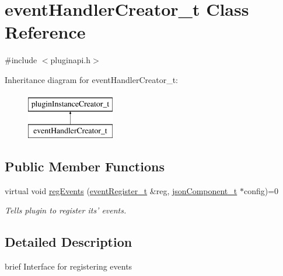 \hypertarget{classeventHandlerCreator__t}{\section{event\-Handler\-Creator\-\_\-t \-Class \-Reference}
\label{classeventHandlerCreator__t}
}


{\ttfamily \#include $<$pluginapi.\-h$>$}

\-Inheritance diagram for event\-Handler\-Creator\-\_\-t\-:\begin{figure}[H]
\begin{center}
\leavevmode
\includegraphics[height=2.000000cm]{classeventHandlerCreator__t}
\end{center}
\end{figure}
\subsection*{\-Public \-Member \-Functions}
\begin{DoxyCompactItemize}
\item 
virtual void \hyperlink{classeventHandlerCreator__t_a89472cf383359bbfd86595050a277263}{reg\-Events} (\hyperlink{classeventRegister__t}{event\-Register\-\_\-t} \&reg, \hyperlink{classjsonComponent__t}{json\-Component\-\_\-t} $\ast$config)=0
\begin{DoxyCompactList}\small\item\em \-Tells plugin to register its' events. \end{DoxyCompactList}\end{DoxyCompactItemize}


\subsection{\-Detailed \-Description}
brief \-Interface for registering events 


